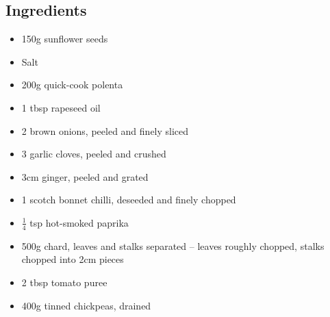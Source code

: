\documentclass{book}
\begin{document}
\subsection*{Ingredients}
\begin{itemize}
\item 150g sunflower seeds
\item Salt
\item 200g quick-cook polenta
\item 1 tbsp rapeseed oil
\item 2 brown onions, peeled and finely sliced
\item 3 garlic cloves, peeled and crushed
\item 3cm ginger, peeled and grated 
\item 1 scotch bonnet chilli, deseeded and finely chopped
\item $\frac{1}{4}$ tsp hot-smoked paprika
\item 500g chard, leaves and stalks separated – leaves roughly chopped, stalks chopped into 2cm pieces
\item 2 tbsp tomato puree
\item 400g tinned chickpeas, drained
\end{itemize}
\end{document}
